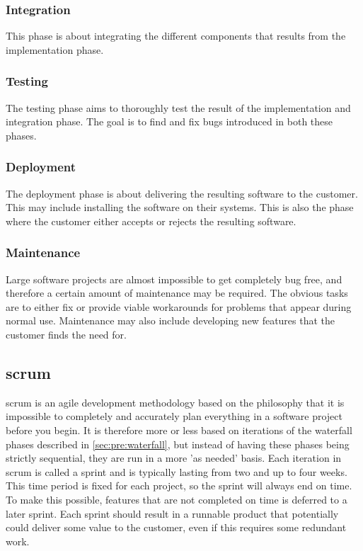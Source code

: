 \subsubsection{Integration}
This phase is about integrating the different components that results from the
implementation phase.

\subsubsection{Testing}
The testing phase aims to thoroughly test the result of the implementation and
integration phase. The goal is to find and fix bugs introduced in both these
phases.

\subsubsection{Deployment}
The deployment phase is about delivering the resulting software to the
customer. This may include installing the software on their systems. This is
also the phase where the customer either accepts or rejects the resulting
software.

\subsubsection{Maintenance}
Large software projects are almost impossible to get completely bug free, and
therefore a certain amount of maintenance may be required. The obvious tasks
are to either fix or provide viable workarounds for problems that appear during
normal use. Maintenance may also include developing new features that the
customer finds the need for.

\subsection{\Gls{scrum}}
\label{sec:pre:scrum}
\Gls{scrum} is an agile development methodology based on the philosophy that it is
impossible to completely and accurately plan everything in a software project
before you begin. It is therefore more or less based on iterations of the
waterfall phases described in \autoref{sec:pre:waterfall}, but instead of
having these phases being strictly sequential, they are run in a more
'as needed' basis. Each iteration in \Gls{scrum} is called a sprint and is typically
lasting from two and up to four weeks. This time period is fixed for each
project, so the sprint will always end on time. To make this possible, features
that are not completed on time is deferred to a later sprint. Each sprint
should result in a runnable product that potentially could deliver some value
to the customer, even if this requires some redundant work.

